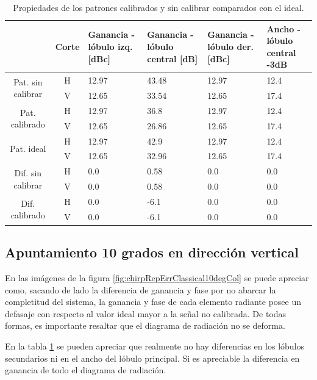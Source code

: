 \begin{table}[H]
  \footnotesize
  \centering
  \begin{tabular}{|c|c|p{2cm}|p{2.5cm}|p{2.5cm}|p{2.5cm}|}
    \cline{2-6}
    \multicolumn{1}{c|}{} & Corte & Ganancia - lóbulo izq. [dBc] & Ganancia - lóbulo central [dB] &
    Ganancia - lóbulo der. [dBc] & Ancho - lóbulo central -3dB \tabularnewline\hline
    \multirow{2}{2cm}{Pat. sin calibrar} & H & 12.97 & 43.48 & 12.97 & 12.4 \tabularnewline\cline{2-6}
     & V & 12.65 & 33.54 & 12.65 & 17.4 \tabularnewline\hline
    \multirow{2}{2cm}{Pat. calibrado} & H & 12.97 & 36.8 & 12.97 & 12.4 \tabularnewline\cline{2-6}
     & V & 12.65 & 26.86 & 12.65 & 17.4 \tabularnewline\hline
    \multirow{2}{2cm}{Pat. ideal} & H & 12.97 & 42.9 & 12.97 & 12.4 \tabularnewline\cline{2-6}
     & V & 12.65 & 32.96 & 12.65 & 17.4 \tabularnewline\hline
    \multirow{2}{2cm}{Dif. sin calibrar} & H & 0.0 & 0.58 & 0.0 & 0.0\tabularnewline\cline{2-6}
     & V & 0.0 & 0.58 & 0.0 & 0.0 \tabularnewline\hline
    \multirow{2}{2cm}{Dif. calibrado} & H & 0.0 & -6.1 & 0.0 & 0.0 \tabularnewline\cline{2-6}
     & V & 0.0 & -6.1 & 0.0 & 0.0 \tabularnewline\hline
  \end{tabular}
  \caption{Propiedades de los patrones calibrados y sin calibrar comparados con el ideal.}
  \label{tab:chirpRepErrClassical10degCol}
\end{table}


\subsection{Apuntamiento 10 grados en dirección vertical}

En las imágenes de la figura \ref{fig:chirpRepErrClassical10degCol} se puede apreciar como, sacando de lado la diferencia de 
ganancia y fase por no abarcar la completitud del sistema, la ganancia y fase de cada elemento radiante posee un defasaje con 
respecto al valor ideal mayor a la señal no calibrada. De todas formas, es importante resaltar que el diagrama de radiación no 
se deforma. 

En la tabla \ref{tab:chirpRepErrClassical10degCol} se pueden apreciar que realmente no hay diferencias en los lóbulos secundarios 
ni en el ancho del lóbulo principal. Si es apreciable la diferencia en ganancia de todo el diagrama de radiación.

